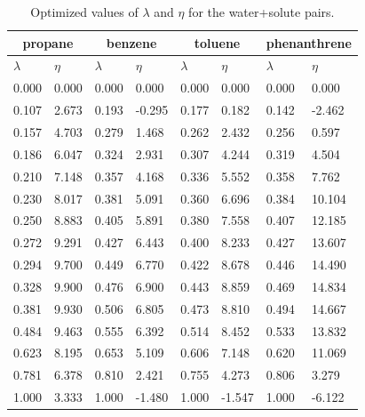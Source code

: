 \FloatBarrier
\begin{table}[h]
	\centering
	\caption{Optimized values of $\lambda $ and $\eta $ for the water+solute pairs. }
	\label{tbl:lambdawater}
	\begin{tabular}{llllllll}
		\hline\hline
		\multicolumn{2}{c}{propane}& \multicolumn{2}{c}{benzene}& \multicolumn{2}{c}{toluene}& \multicolumn{2}{c}{phenanthrene}\\
		\hline\hline
		$\lambda$ & $\eta$ & $\lambda$ & $\eta$  & $\lambda$ & $\eta$  & $\lambda$ & $\eta$ \\ 
		\hline\hline
		0.000	&	0.000	&	0.000	&	0.000	&	0.000	&	0.000	&	0.000	&	0.000	\\
		0.107	&	2.673	&	0.193	&	-0.295	&	0.177	&	0.182	&	0.142	&	-2.462	\\
		0.157	&	4.703	&	0.279	&	1.468	&	0.262	&	2.432	&	0.256	&	0.597	\\
		0.186	&	6.047	&	0.324	&	2.931	&	0.307	&	4.244	&	0.319	&	4.504	\\
		0.210	&	7.148	&	0.357	&	4.168	&	0.336	&	5.552	&	0.358	&	7.762	\\
		0.230	&	8.017	&	0.381	&	5.091	&	0.360	&	6.696	&	0.384	&	10.104	\\
		0.250	&	8.883	&	0.405	&	5.891	&	0.380	&	7.558	&	0.407	&	12.185	\\
		0.272	&	9.291	&	0.427	&	6.443	&	0.400	&	8.233	&	0.427	&	13.607	\\
		0.294	&	9.700	&	0.449	&	6.770	&	0.422	&	8.678	&	0.446	&	14.490	\\
		0.328	&	9.900	&	0.476	&	6.900	&	0.443	&	8.859	&	0.469	&	14.834	\\
		0.381	&	9.930	&	0.506	&	6.805	&	0.473	&	8.810	&	0.494	&	14.667	\\
		0.484	&	9.463	&	0.555	&	6.392	&	0.514	&	8.452	&	0.533	&	13.832	\\
		0.623	&	8.195	&	0.653	&	5.109	&	0.606	&	7.148	&	0.620	&	11.069	\\
		0.781	&	6.378	&	0.810	&	2.421	&	0.755	&	4.273	&	0.806	&	3.279	\\
		1.000	&	3.333	&	1.000	&	-1.480	&	1.000	&	-1.547	&	1.000	&	-6.122	\\		
		\hline\hline
	\end{tabular}
\end{table}

